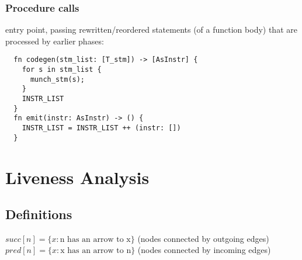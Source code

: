 \documentclass[8pt]{extarticle}
\begin{document}
\begin{multicols*}{2}
  \subsubsection{Procedure calls}

  entry point, passing rewritten/reordered statements (of a function body) that are processed by earlier phases:
\begin{verbatim}
  fn codegen(stm_list: [T_stm]) -> [AsInstr] {
    for s in stm_list {
      munch_stm(s);
    }
    INSTR_LIST
  }
  fn emit(instr: AsInstr) -> () { 
    INSTR_LIST = INSTR_LIST ++ (instr: [])
  }
\end{verbatim}  

  \vfill\null
  \columnbreak

  \section{Liveness Analysis}

  \subsection{Definitions}

  $succ[n]=\{x:\text{n has an arrow to x}\}$ (nodes connected by outgoing edges)\\
  $pred[n]=\{x:\text{x has an arrow to n}\}$ (nodes connected by incoming edges)


\end{multicols*}
\end{document}

